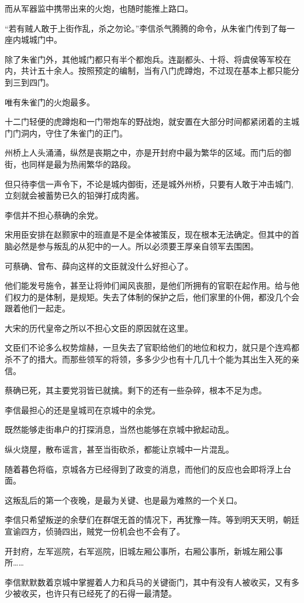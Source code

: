 而从军器监中携带出来的火炮，也随时能推上路口。

“若有贼人敢于上街作乱，杀之勿论。”李信杀气腾腾的命令，从朱雀门传到了每一座内城城门中。

除了朱雀门外，其他城门都只有半个都炮兵。连副都头、十将、将虞侯等军校在内，共计五十余人。按照预定的编制，当有八门虎蹲炮，不过现在基本上都只能分到三到四门。

唯有朱雀门的火炮最多。

十二门轻便的虎蹲炮和一门带炮车的野战炮，就安置在大部分时间都紧闭着的主城门门洞内，守住了朱雀门的正门。

州桥上人头涌涌，纵然是丧期之中，亦是开封府中最为繁华的区域。而门后的御街，也同样是最为热闹繁华的路段。

但只待李信一声令下，不论是城内御街，还是城外州桥，只要有人敢于冲击城门,立刻就会被蓄势已久的铅弹打成肉酱。

李信并不担心蔡确的余党。

宋用臣安排在赵颢家中的班直是不是全体被策反，现在根本无法确定。但其中的首脑必然是参与叛乱的从犯中的一人。所以必须要王厚亲自领军去围困。

可蔡确、曾布、薛向这样的文臣就没什么好担心了。

他们能发号施令，甚至让将帅们闻风丧胆，是他们所拥有的官职在起作用。给与他们权力的是体制，是规矩。失去了体制的保护之后，他们家里的仆佣，都没几个会跟着他们一起走。

大宋的历代皇帝之所以不担心文臣的原因就在这里。

文臣们不论多么权势煊赫，一旦失去了官职给他们的地位和权力，就只是个连鸡都杀不了的措大。而那些领军的将领，多多少少也有十几几十个能为其出生入死的亲信。

蔡确已死，其主要党羽皆已就擒。剩下的还有一些杂碎，根本不足为虑。

李信最担心的还是皇城司在京城中的余党。

既然能够走街串户的打探消息，当然也能够在京城中掀起动乱。

纵火烧屋，散布谣言，甚至当街砍杀，都能让京城中一片混乱。

随着暮色将临，京城各方已经得到了政变的消息，而他们的反应也会即将浮上台面。

这叛乱后的第一个夜晚，是最为关键、也是最为难熬的一个关口。

李信只希望叛逆的余孽们在群氓无首的情况下，再犹豫一阵。等到明天天明，朝廷宣谕四方，侦骑四出，贼党一份机会也不会有了。

开封府，左军巡院，右军巡院，旧城左厢公事所，右厢公事所，新城左厢公事所……

李信默默数着京城中掌握着人力和兵马的关键衙门，其中有没有人被收买，又有多少被收买，也许只有已经死了的石得一最清楚。

